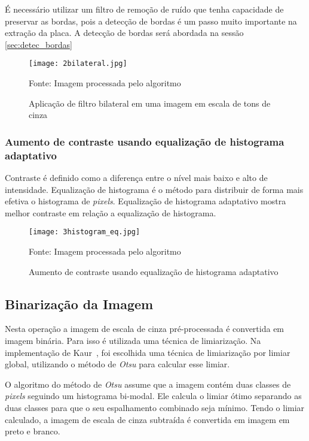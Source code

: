 É necessário utilizar um filtro de remoção de ruído que tenha capacidade de preservar as bordas, pois a detecção de bordas é um passo muito importante na extração da placa. A detecção de bordas será abordada na sessão \ref{sec:detec_bordas}

\begin{figure}[H]
	\centering
	\texttt{[image: 2bilateral.jpg]}
	\caption{Aplicação de filtro bilateral em uma imagem em escala de tons de cinza}
Fonte: Imagem processada pelo algoritmo
	\label{fig:ext_filter_in_gray_scale}
\end{figure}

\subsubsection{Aumento de contraste usando equalização de histograma adaptativo}

Contraste é definido como a diferença entre o nível mais baixo e alto de
intensidade. Equalização de histograma é o método para distribuir de forma mais
efetiva o histograma de \emph{pixels}. Equalização de histograma adaptativo
mostra melhor contraste em relação a equalização de histograma.

\begin{figure}[H]
	\centering
	\texttt{[image: 3histogram\_eq.jpg]}
	\caption{Aumento de contraste usando equalização de histograma adaptativo}
Fonte: Imagem processada pelo algoritmo
	\label{fig:ext_contrast_adaptive_histogram}
\end{figure}

\subsection{Binarização da Imagem}

Nesta operação a imagem de escala de cinza pré-processada é convertida em imagem binária. Para isso é utilizada uma técnica de limiarização. Na implementação de Kaur~\cite{kaur2014efficient}, foi escolhida uma técnica de limiarização por limiar global, utilizando o método de \emph{Otsu} para calcular esse limiar. 

O algoritmo do método de \emph{Otsu} assume que  a imagem contém duas classes de \emph{pixels} seguindo um histograma bi-modal. Ele calcula o limiar ótimo separando as duas classes para que o seu espalhamento combinado seja mínimo. Tendo o limiar calculado, a imagem de escala de cinza subtraída é convertida em imagem em preto e branco.

